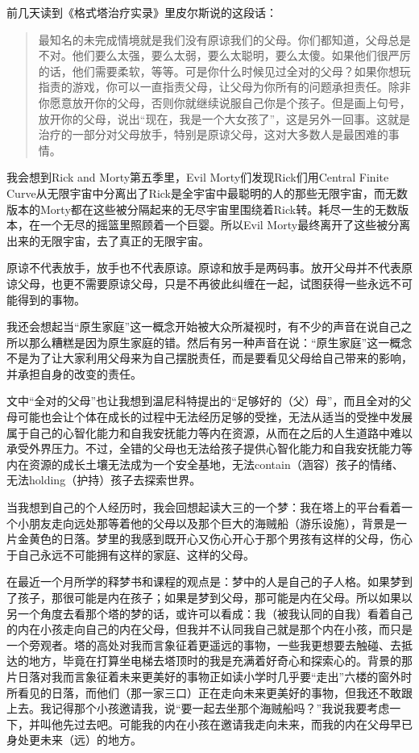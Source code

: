 前几天读到《格式塔治疗实录》里皮尔斯说的这段话：

\blockquote{最知名的未完成情境就是我们没有原谅我们的父母。你们都知道，父母总是不对。他们要么太强，要么太弱，要么太聪明，要么太傻。如果他们很严厉的话，他们需要柔软，等等。可是你什么时候见过全对的父母？如果你想玩指责的游戏，你可以一直指责父母，让父母为你所有的问题承担责任。除非你愿意放开你的父母，否则你就继续说服自己你是个孩子。但是画上句号，放开你的父母，说出“现在，我是一个大女孩了”，这是另外一回事。这就是治疗的一部分\pozhehao{}对父母放手，特别是原谅父母，这对大多数人是最困难的事情。}


我会想到Rick and Morty第五季里，Evil Morty们发现Rick们用Central Finite Curve从无限宇宙中分离出了Rick是全宇宙中最聪明的人的那些无限宇宙，而无数版本的Morty都在这些被分隔起来的无尽宇宙里围绕着Rick转。耗尽一生的无数版本，在一个无尽的摇篮里照顾着一个巨婴。所以Evil Morty最终离开了这些被分离出来的无限宇宙，去了真正的无限宇宙。

原谅不代表放手，放手也不代表原谅。原谅和放手是两码事。放开父母并不代表原谅父母，也更不需要原谅父母，只是不再彼此纠缠在一起，试图获得一些永远不可能得到的事物。

我还会想起当“原生家庭”这一概念开始被大众所凝视时，有不少的声音在说自己之所以那么糟糕是因为原生家庭的错。然后有另一种声音在说：“原生家庭”这一概念不是为了让大家利用父母来为自己摆脱责任，而是要看见父母给自己带来的影响，并承担自身的改变的责任。

文中“全对的父母”也让我想到温尼科特提出的“足够好的（父）母”，而且全对的父母可能也会让个体在成长的过程中无法经历足够的受挫，无法从适当的受挫中发展属于自己的心智化能力和自我安抚能力等内在资源，从而在之后的人生道路中难以承受外界压力。不过，全错的父母也无法给孩子提供心智化能力和自我安抚能力等内在资源的成长土壤\pozhehao{}无法成为一个安全基地，无法contain（涵容）孩子的情绪、无法holding（护持）孩子去探索世界。

\tristarsepline

当我想到自己的个人经历时，我会回想起读大三的一个梦：我在塔上的平台看着一个小朋友走向远处那等着他的父母以及那个巨大的海贼船（游乐设施），背景是一片金黄色的日落。梦里的我感到既开心又伤心\pozhehao{}开心于那个男孩有这样的父母，伤心于自己永远不可能拥有这样的家庭、这样的父母。

在最近一个月所学的释梦书和课程的观点是：梦中的人是自己的子人格。如果梦到了孩子，那很可能是内在孩子；如果是梦到父母，那可能是内在父母。所以如果以另一个角度去看那个塔的梦的话，或许可以看成：我（被我认同的自我）看着自己的内在小孩走向自己的内在父母，但我并不认同我自己就是那个内在小孩，而只是一个旁观者。塔的高处对我而言象征着更遥远的事物，一些我更想要去触碰、去抵达的地方，毕竟在打算坐电梯去塔顶时的我是充满着好奇心和探索心的。背景的那片日落对我而言象征着未来更美好的事物\pozhehao{}正如读小学时几乎要“走出”六楼的窗外时所看见的日落，而他们（那一家三口）正在走向未来更美好的事物，但我还不敢跟上去。我记得那个小孩邀请我，说“要一起去坐那个海贼船吗？”我说我要考虑一下，并叫他先过去吧。可能我的内在小孩在邀请我走向未来，而我的内在父母早已身处更未来（远）的地方。

